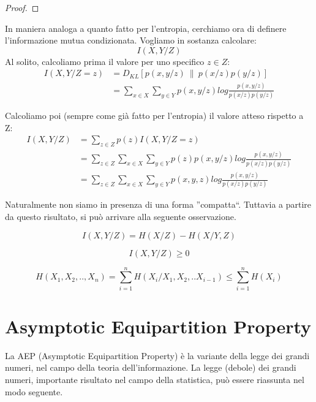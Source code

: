 \begin{osservazione}
\begin{proof}
\end{proof}
\label{entrconcava}
\end{osservazione}

In maniera analoga a quanto fatto per l'entropia, cerchiamo ora di definere l'informazione mutua condizionata.
Vogliamo in sostanza calcolare:
\[
 I(X,Y/Z)
\]
Al solito, calcoliamo prima il valore per uno specifico $z \in Z$:
\[\begin{split}
 I(X,Y/Z=z)&=D_{KL}[p(x,y/z) \ \| \ p(x/z)p(y/z)] \\
 &=\sum_{x \in X} \sum_{y \in Y} p(x,y/z) log \frac{p(x,y/z)}{p(x/z)p(y/z)}
  \end{split}
\]

\noindent
Calcoliamo poi (sempre come già fatto per l'entropia) il valore atteso rispetto a Z:
\[
 \begin{split}
 I(X,Y/Z)&=\sum_{z \in Z} p(z) I(X,Y/Z=z) \\
 &=\sum_{z \in Z} \sum_{x \in X} \sum_{y \in Y} p(z)p(x,y/z) log \frac{p(x,y/z)}{p(x/z)p(y/z)} \\
 &=\sum_{z \in Z} \sum_{x \in X} \sum_{y \in Y} p(x,y,z) log \frac{p(x,y/z)}{p(x/z)p(y/z)}
  \end{split}
\]

\bigskip
\noindent
Naturalmente non siamo in presenza di una forma ''compatta``. Tuttavia a partire da questo risultato, 
si può arrivare alla seguente osservazione.

\begin{osservazione}
 \[
 I(X,Y/Z)=H(X/Z)-H(X/Y,Z)
\]
\end{osservazione}

\begin{osservazione}
 \[
  I(X,Y/Z) \ge 0
 \]
\end{osservazione}

\begin{osservazione}
\[
 H(X_1,X_2,..,X_n)=\sum_{i=1}^n H(X_i/X_1,X_2,..X_{i-1}) \le \sum_{i=1}^n H(X_i)
\]
\end{osservazione}


\section{Asymptotic Equipartition Property}
\label{aep}
La AEP (Asymptotic Equipartition Property) è la variante della legge dei grandi numeri, nel campo della teoria dell'informazione.
La legge (debole) dei grandi numeri, importante risultato nel campo della statistica, può essere riassunta nel modo seguente.

